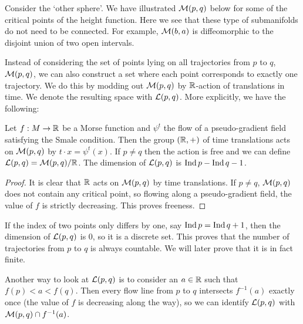 \begin{eg}
    Consider the `other sphere'. 
    We have illustrated $\mathcal M(p, q)$ below for some of the critical points of the height function.
    Here we see that these type of submanifolds do not need to be connected. For example, $\mathcal M(b, a)$ is diffeomorphic to the disjoint union of two open intervals.
\end{eg}

Instead of considering the set of points lying on all trajectories from $p$ to $q$, $\mathcal M(p, q)$, we can also construct a set where each point corresponds to exactly one trajectory.
We do this by modding out $\mathcal M(p, q)$ by $\mathbb{R}$-action of translations in time. We denote the resulting space with $\mathcal L(p, q)$.
More explicitly, we have the following:

\begin{prop}
    Let $f: M \to  \mathbb{R}$ be a Morse function and $\psi^{t}$ the flow of a pseudo-gradient field satisfying the Smale condition.
    Then the group $(\mathbb{R}, +)$ of time translations acts on $\mathcal M(p, q)$ by  $t \cdot x = \psi^{t}(x)$.  If $p \neq q$ then the action is free and we can define $ \mathcal L(p, q) = \mathcal M(p, q) / \mathbb{R} $. The dimension of $\mathcal L(p, q)$ is $\operatorname{Ind} p - \operatorname{Ind} q - 1$.
\end{prop}
\begin{proof}
    It is clear that $\mathbb{R}$ acts on $\mathcal M(p, q)$ by time translations. 
    If $p \neq q$,  $\mathcal M(p, q)$ does not contain any critical point, so flowing along a pseudo-gradient field, the value of $f$ is strictly decreasing. This proves freeness.
\end{proof}

\begin{remark}
    If the index of two points only differs by one, say $\operatorname{Ind} p = \operatorname{Ind} q + 1$, then the dimension of $\mathcal L(p, q)$ is $0$, so it is a discrete set.
    This proves that the number of trajectories from $p$ to $q$ is always countable.
    We will later prove that it is in fact finite.
    \label{remark:trajectories-finite}
\end{remark}
\begin{remark}
    Another way to look at $\mathcal L(p, q)$ is to consider an $a \in \mathbb{R}$ such that $f(p)<a<f(q)$. Then every flow line from $p$ to $q$  intersects $f^{-1}(a)$ exactly once (the value of $f$ is decreasing along the way), so we can identify  $\mathcal L(p, q)$ with  $\mathcal M(p, q) \cap f^{-1}(a)$.
\end{remark}




